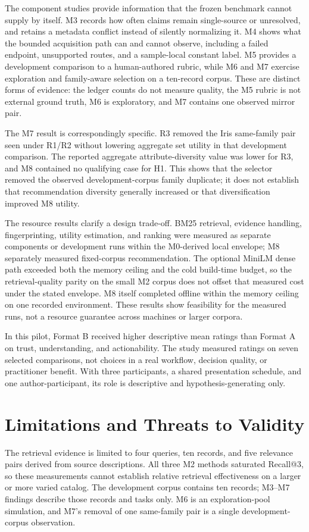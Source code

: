\documentclass[conference]{IEEEtran}
\begin{document}
The component studies provide information that the frozen benchmark cannot supply by itself. M3 records how often claims remain single-source or unresolved, and retains a metadata conflict instead of silently normalizing it. M4 shows what the bounded acquisition path can and cannot observe, including a failed endpoint, unsupported routes, and a sample-local constant label. M5 provides a development comparison to a human-authored rubric, while M6 and M7 exercise exploration and family-aware selection on a ten-record corpus. These are distinct forms of evidence: the ledger counts do not measure quality, the M5 rubric is not external ground truth, M6 is exploratory, and M7 contains one observed mirror pair.

The M7 result is correspondingly specific. R3 removed the Iris same-family pair seen under R1/R2 without lowering aggregate set utility in that development comparison. The reported aggregate attribute-diversity value was lower for R3, and M8 contained no qualifying case for H1. This shows that the selector removed the observed development-corpus family duplicate; it does not establish that recommendation diversity generally increased or that diversification improved M8 utility.

The resource results clarify a design trade-off. BM25 retrieval, evidence handling, fingerprinting, utility estimation, and ranking were measured as separate components or development runs within the M0-derived local envelope; M8 separately measured fixed-corpus recommendation. The optional MiniLM dense path exceeded both the memory ceiling and the cold build-time budget, so the retrieval-quality parity on the small M2 corpus does not offset that measured cost under the stated envelope. M8 itself completed offline within the memory ceiling on one recorded environment. These results show feasibility for the measured runs, not a resource guarantee across machines or larger corpora.

In this pilot, Format B received higher descriptive mean ratings than Format A on trust, understanding, and actionability. The study measured ratings on seven selected comparisons, not choices in a real workflow, decision quality, or practitioner benefit. With three participants, a shared presentation schedule, and one author-participant, its role is descriptive and hypothesis-generating only.

\section{Limitations and Threats to Validity}
The retrieval evidence is limited to four queries, ten records, and five relevance pairs derived from source descriptions. All three M2 methods saturated Recall@3, so these measurements cannot establish relative retrieval effectiveness on a larger or more varied catalog. The development corpus contains ten records; M3--M7 findings describe those records and tasks only. M6 is an exploration-pool simulation, and M7's removal of one same-family pair is a single development-corpus observation.
\end{document}
